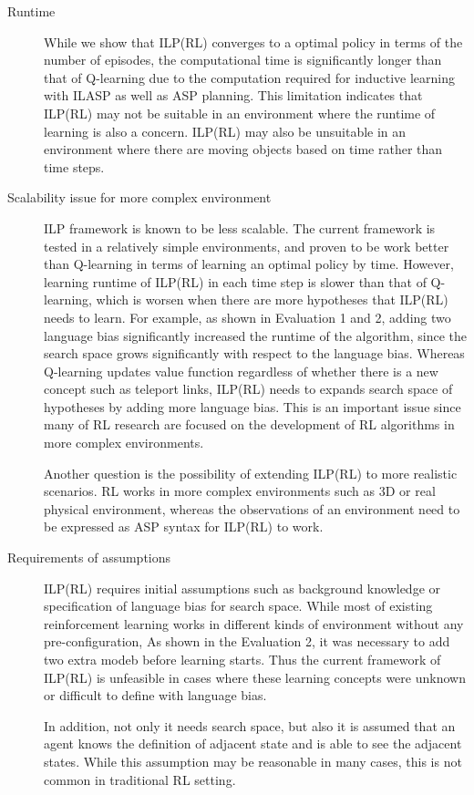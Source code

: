 \begin{description}
\item[Runtime]
While we show that ILP(RL) converges to a optimal policy in terms of the number of episodes, the computational time is significantly longer than that of Q-learning due to the computation required for inductive learning with ILASP as well as ASP planning.
This limitation indicates that ILP(RL) may not be suitable in an environment where the runtime of learning is also a concern. ILP(RL) may also be unsuitable in an environment where there are moving objects based on time rather than time steps.

\item[Scalability issue for more complex environment]
ILP framework is known to be less scalable. The current framework is tested in a relatively simple environments, 
and proven to be work better than Q-learning in terms of learning an optimal policy by time. However, learning runtime of ILP(RL) in each time step is slower than that of Q-learning, which is worsen when there are more hypotheses that ILP(RL) needs to learn.
For example, as shown in Evaluation 1 and 2, adding two language bias significantly increased the runtime of the algorithm, since the search space grows significantly with respect to the language bias.
Whereas Q-learning updates value function regardless of whether there is a new concept such as teleport links, ILP(RL) needs to expands search space of hypotheses by adding more language bias. This is an important issue since many of RL research are focused on the development of RL algorithms in more complex environments.

Another question is the possibility of extending ILP(RL) to more realistic scenarios. RL works in more complex environments such as 3D or real physical environment, 
whereas the observations of an environment need to be expressed as ASP syntax for ILP(RL) to work.
\item[Requirements of assumptions]
ILP(RL) requires initial assumptions such as background knowledge or specification of language bias for search space. While most of existing reinforcement learning works in different kinds of environment without any pre-configuration, As shown in the Evaluation 2, it was necessary to add two extra modeb before learning starts.
Thus the current framework of ILP(RL) is unfeasible in cases where these learning concepts were unknown or difficult to define with language bias.

In addition, not only it needs search space, but also it is assumed that an agent knows the definition of adjacent state and is able to see the adjacent states. 
While this assumption may be reasonable in many cases, this is not common in traditional RL setting.


\end{description}
